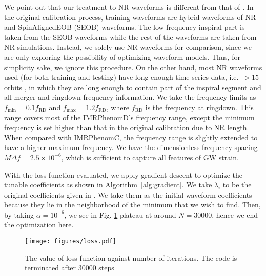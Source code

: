 \documentclass[twocolumn]{aastex631}
\newcommand{\te}[1]{{\color{rr}[TE: #1 ]}}
\begin{document}
We point out that our treatment to NR waveforms is different from that of \citep{husa2016frequency, khan2016frequency}. In the original calibration process, training waveforms are hybrid waveforms of NR and SpinAlignedEOB
(SEOB) waveforms. The low frequency inspiral part is taken from the SEOB
waveforms while the rest of the waveforms are taken from NR simulations.
Instead, we solely use NR waveforms for comparison, since we are only exploring the possibility of optimizing waveform models. Thus, for simplicity sake, we ignore this procedure. On the other hand, most NR waveforms used (for both training and testing) have long enough time series data, i.e.~$>15$ orbits \citep{boyle2019sxs}, in
which they are long enough to contain part of the inspiral segment and all
merger and ringdown frequency information. We take the frequency limits as
$f_{\mathrm{min}}=0.1f_{\mathrm{RD}}$ and $f_{\mathrm{max}}=1.2f_{\mathrm{RD}}$,	
where $f_{\mathrm{RD}}$ is the frequency at ringdown. This range covers most of
the IMRPhenomD's frequency range, except the minimum frequency is set higher
than that in the original calibration due to NR length. When compared with
IMRPhenomC, the frequency range is slightly extended to have a higher maximum
frequency. We have the dimensionless frequency spacing $M\Delta f=2.5\times10^{-6}$, 
which is sufficient to capture all features of GW strain. 

With the loss function evaluated, we apply gradient descent to optimize the tunable
coefficients as shown in Algorithm~\ref{alg:gradient}. We take $\lambda_i$ to be the 
original coefficients given in \citep{khan2016frequency}. We take them as the initial 
waveform coefficients because they lie in the neighborhood of the minimum that we wish 
to find. Then, by taking $\alpha=10^{-6}$, we see in Fig. \ref{fig:loss} plateau at 
around $N=30000$, hence we end the optimization here.  

\begin{figure}
	\centering
	\texttt{[image: figures/loss.pdf]}
	\caption{The value of loss function against number of iterations. The code is terminated after 30000 steps }
	\label{fig:loss}
\end{figure}
\end{document}
